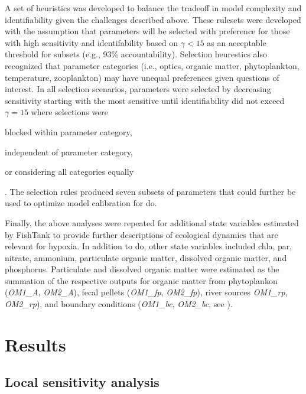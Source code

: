 \documentclass[letterpaper,12pt,oneside]{article}\usepackage[]{graphicx}\usepackage[]{color}
\begin{document}
A set of heuristics was developed to balance the tradeoff in model complexity and identifiability given the challenges described above.  These rulesets were developed with the assumption that parameters will be selected with preference for those with high sensitivity and identifability based on $\gamma < 15$ as an acceptable threshold for subsets (e.g., 93\% accountability).  Selection heurestics also recognized that parameter categories (i.e., optics, organic matter, phytoplankton, temperature, zooplankton) may have unequal preferences given questions of interest.  In all selection scenarios, parameters were selected by decreasing sensitivity starting with the most sensitive until identifiability did not exceed $\gamma = 15$ where selections were \begin{inparaenum}[1\upshape)]
\item blocked within parameter category,
\item independent of parameter category,
\item or considering all categories equally
\end{inparaenum}.  The selection rules produced seven subsets of parameters that could further be used to optimize model calibration for \ac{do}.

Finally, the above analyses were repeated for additional state variables estimated by FishTank to provide further descriptions of ecological dynamics that are relevant for hypoxia.  In addition to \ac{do}, other state variables included \ac{chla}, \ac{par}, nitrate, ammonium, particulate organic matter, dissolved organic matter, and phosphorus.  Particulate and dissolved organic matter were estimated as the summation of the respective outputs for organic matter from phytoplankon (\textit{OM1\_A}, \textit{OM2\_A}), fecal pellets (\textit{OM1\_fp}, \textit{OM2\_fp}), river sources \textit{OM1\_rp}, \textit{OM2\_rp}), and boundary conditions (\textit{OM1\_bc}, \textit{OM2\_bc}, see ). 

\section{Results}



\subsection{Local sensitivity analysis}
\end{document}
